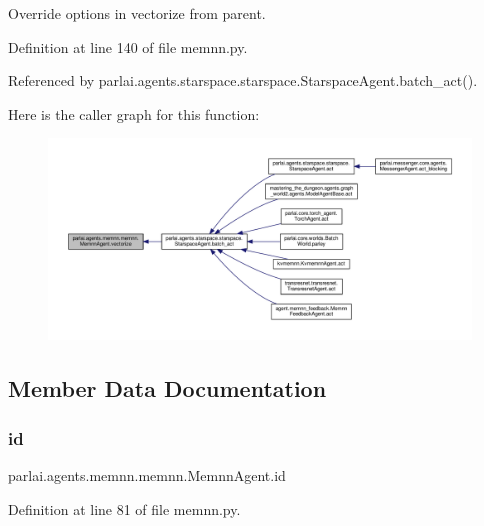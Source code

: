\begin{DoxyVerb}Override options in vectorize from parent.\end{DoxyVerb}
 

Definition at line 140 of file memnn.\+py.



Referenced by parlai.\+agents.\+starspace.\+starspace.\+Starspace\+Agent.\+batch\+\_\+act().

Here is the caller graph for this function\+:
\nopagebreak
\begin{figure}[H]
\begin{center}
\leavevmode
\includegraphics[width=350pt]{classparlai_1_1agents_1_1memnn_1_1memnn_1_1MemnnAgent_a4c2d3c0bb7d0b78b1c6aa91eca8dd24e_icgraph}
\end{center}
\end{figure}


\subsection{Member Data Documentation}
\mbox{\label{classparlai_1_1agents_1_1memnn_1_1memnn_1_1MemnnAgent_ac313c81db957b095beb84fa7ef1c1286}} 
\subsubsection{\texorpdfstring{id}{id}}
{\footnotesize\ttfamily parlai.\+agents.\+memnn.\+memnn.\+Memnn\+Agent.\+id}



Definition at line 81 of file memnn.\+py.



